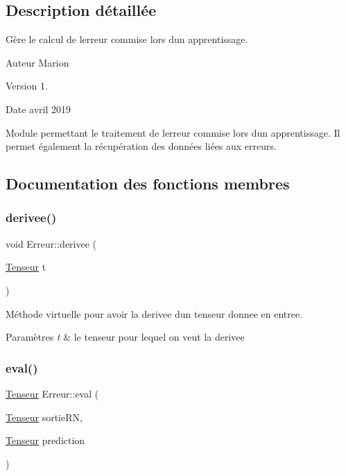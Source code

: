 \subsection{Description détaillée}
Gère le calcul de l\textquotesingle{}erreur commise lors d\textquotesingle{}un apprentissage. 

\begin{DoxyAuthor}{Auteur}
Marion 
\end{DoxyAuthor}
\begin{DoxyVersion}{Version}
1. 
\end{DoxyVersion}
\begin{DoxyDate}{Date}
avril 2019
\end{DoxyDate}
Module permettant le traitement de l\textquotesingle{}erreur commise lors d\textquotesingle{}un apprentissage. Il permet également la récupération des données liées aux erreurs. 

\subsection{Documentation des fonctions membres}
\mbox{\label{classErreur_ad56634307e3ceb8ab5c2fddede28422a}} 
\subsubsection{\texorpdfstring{derivee()}{derivee()}}
{\footnotesize\ttfamily void Erreur\+::derivee (\begin{DoxyParamCaption}\item[{\hyperlink{classTenseur}{Tenseur}}]{t }\end{DoxyParamCaption})\hspace{0.3cm}{\ttfamily [virtual]}}



Méthode virtuelle pour avoir la derivee d\textquotesingle{}un tenseur donnee en entree. 


\begin{DoxyParams}{Paramètres}
{\em t} & le tenseur pour lequel on veut la derivee \\
\hline
\end{DoxyParams}
\mbox{\label{classErreur_a0def45df23074388e2a338145aeb4660}} 
\subsubsection{\texorpdfstring{eval()}{eval()}}
{\footnotesize\ttfamily \hyperlink{classTenseur}{Tenseur} Erreur\+::eval (\begin{DoxyParamCaption}\item[{\hyperlink{classTenseur}{Tenseur}}]{sortie\+RN,  }\item[{\hyperlink{classTenseur}{Tenseur}}]{prediction }\end{DoxyParamCaption})\hspace{0.3cm}{\ttfamily [virtual]}}



